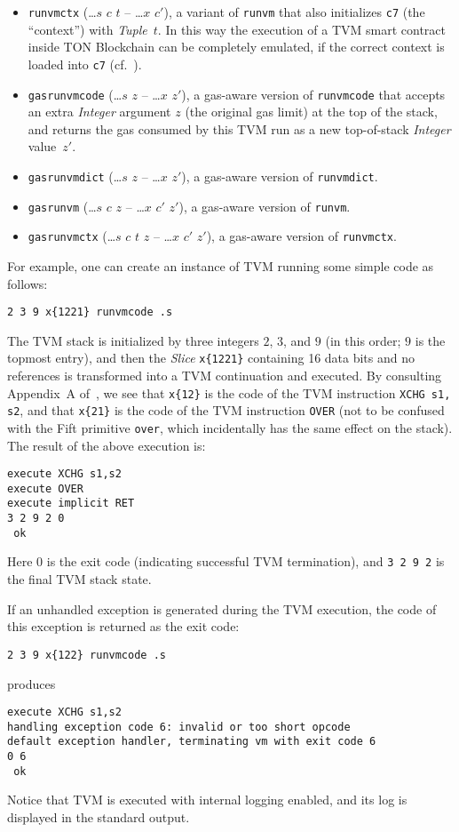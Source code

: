\documentclass[12pt,oneside]{article}
\begin{document}
\begin{itemize}
\item {\tt runvmctx} (\dots $s$ $c$ $t$ -- \dots $x$ $c'$), a variant of {\tt runvm} that also initializes {\tt c7} (the ``context'') with {\em Tuple\/}~$t$. In this way the execution of a TVM smart contract inside TON Blockchain can be completely emulated, if the correct context is loaded into {\tt c7} (cf.~\cite[4.4.10]{TBC}).
\item {\tt gasrunvmcode} (\dots $s$ $z$ -- \dots $x$ $z'$), a gas-aware version of {\tt runvmcode} that accepts an extra {\em Integer\/} argument $z$ (the original gas limit) at the top of the stack, and returns the gas consumed by this TVM run as a new top-of-stack {\em Integer\/} value~$z'$.
\item {\tt gasrunvmdict} (\dots $s$ $z$ -- \dots $x$ $z'$), a gas-aware version of {\tt runvmdict}.
\item {\tt gasrunvm} (\dots $s$ $c$ $z$ -- \dots $x$ $c'$ $z'$), a gas-aware version of {\tt runvm}.
\item {\tt gasrunvmctx} (\dots $s$ $c$ $t$ $z$ -- \dots $x$ $c'$ $z'$), a gas-aware version of {\tt runvmctx}.
\end{itemize}
For example, one can create an instance of TVM running some simple code as follows:
\begin{verbatim}
2 3 9 x{1221} runvmcode .s
\end{verbatim}
The TVM stack is initialized by three integers $2$, $3$, and $9$ (in this order; $9$ is the topmost entry), and then the {\em Slice\/} {\tt x\{1221\}} containing 16 data bits and no references is transformed into a TVM continuation and executed. By consulting Appendix~A of~\cite{TVM}, we see that {\tt x\{12\}} is the code of the TVM instruction {\tt XCHG s1, s2}, and that {\tt x\{21\}} is the code of the TVM instruction {\tt OVER} (not to be confused with the Fift primitive {\tt over}, which incidentally has the same effect on the stack). The result of the above execution is:
\begin{verbatim}
execute XCHG s1,s2
execute OVER
execute implicit RET
3 2 9 2 0
 ok
\end{verbatim}
Here $0$ is the exit code (indicating successful TVM termination), and {\tt 3 2 9 2} is the final TVM stack state.

If an unhandled exception is generated during the TVM execution, the code of this exception is returned as the exit code:
\begin{verbatim}
2 3 9 x{122} runvmcode .s
\end{verbatim}
produces
\begin{verbatim}
execute XCHG s1,s2
handling exception code 6: invalid or too short opcode
default exception handler, terminating vm with exit code 6
0 6
 ok
\end{verbatim}
Notice that TVM is executed with internal logging enabled, and its log is displayed in the standard output.
\end{document}

